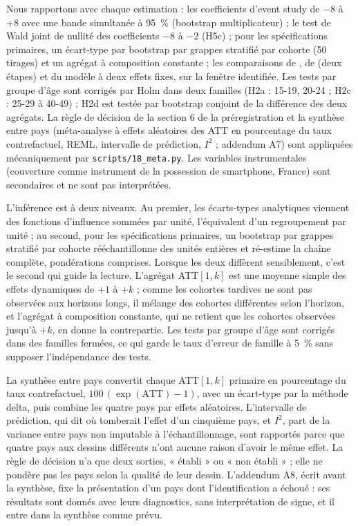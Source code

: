 \documentclass[11pt,a4paper]{article}
\begin{document}
Nous rapportons avec chaque estimation : les coefficients d'event study de $-8$ à $+8$ avec une bande simultanée à 95~\% (bootstrap multiplicateur) ; le test de Wald joint de nullité des coefficients $-8$ à $-2$ (H5c) ; pour les spécifications primaires, un écart-type par bootstrap par grappes stratifié par cohorte (50 tirages) et un agrégat à composition constante ; les comparaisons de \citet{sun2021}, de \citet{gardner2022} (deux étapes) et du modèle à deux effets fixes, sur la fenêtre identifiée. Les tests par groupe d'âge sont corrigés par Holm dans deux familles (H2a : 15-19, 20-24 ; H2c : 25-29 à 40-49) ; H2d est testée par bootstrap conjoint de la différence des deux agrégats. La règle de décision de la section 6 de la préregistration et la synthèse entre pays (méta-analyse à effets aléatoires des ATT en pourcentage du taux contrefactuel, REML, intervalle de prédiction, $I^2$ ; addendum A7) sont appliquées mécaniquement par \texttt{scripts/18\_meta.py}. Les variables instrumentales (couverture comme instrument de la possession de smartphone, France) sont secondaires et ne sont pas interprétées.

L'inférence est à deux niveaux. Au premier, les écarts-types analytiques viennent des fonctions d'influence sommées par unité, l'équivalent d'un regroupement par unité ; au second, pour les spécifications primaires, un bootstrap par grappes stratifié par cohorte rééchantillonne des unités entières et ré-estime la chaîne complète, pondérations comprises. Lorsque les deux diffèrent sensiblement, c'est le second qui guide la lecture. L'agrégat ATT$[1,k]$ est une moyenne simple des effets dynamiques de $+1$ à $+k$ ; comme les cohortes tardives ne sont pas observées aux horizons longs, il mélange des cohortes différentes selon l'horizon, et l'agrégat à composition constante, qui ne retient que les cohortes observées jusqu'à $+k$, en donne la contrepartie. Les tests par groupe d'âge sont corrigés dans des familles fermées, ce qui garde le taux d'erreur de famille à 5~\% sans supposer l'indépendance des tests.

La synthèse entre pays convertit chaque ATT$[1,k]$ primaire en pourcentage du taux contrefactuel, $100\,(\exp(\mathrm{ATT})-1)$, avec un écart-type par la méthode delta, puis combine les quatre pays par effets aléatoires. L'intervalle de prédiction, qui dit où tomberait l'effet d'un cinquième pays, et $I^2$, part de la variance entre pays non imputable à l'échantillonnage, sont rapportés parce que quatre pays aux dessins différents n'ont aucune raison d'avoir le même effet. La règle de décision n'a que deux sorties, « établi » ou « non établi » ; elle ne pondère pas les pays selon la qualité de leur dessin. L'addendum A8, écrit avant la synthèse, fixe la présentation d'un pays dont l'identification a échoué : ses résultats sont donnés avec leurs diagnostics, sans interprétation de signe, et il entre dans la synthèse comme prévu.
\end{document}
